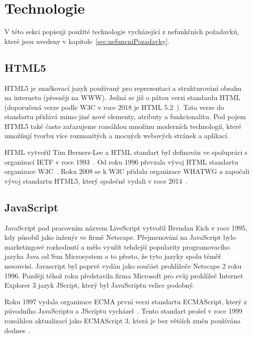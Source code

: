 
\section{Technologie}\label{sec:technologie}
V této sekci popisuji použité technologie vycházející z nefunkčních požadavků, které jsou uvedeny v kapitole~\ref{sec:nefuncniPozadavky}.

\subsection{HTML5}\label{subsec:html5}

HTML5 je značkovací jazyk používaný pro reprezentaci a strukturování  obsahu na internetu (přesněji na \gls{WWW}).
Jedná se již o pátou verzi standardu \gls{HTML} (doporučená verze podle \gls{W3C} v roce 2018 je HTML 5.2~\cite{w3c:html52}).
Tato verze do standartu přidává mimo jiné nové elementy, atributy a funkcionalitu.
Pod pojem HTML5 také často zařazujeme rozsáhlou množinu moderních technologií, které umožňují tvorbu více rozmanitých a mocných webových stránek a aplikací.~\cite{mozzila:html5}

\gls{HTML} vytvořil Tim Berners-Lee a \gls{HTML} standart byl definován ve spolupráci s organizací \gls{IETF} v roce 1993~\cite{html:autor}.
Od roku 1996 převzala vývoj \gls{HTML} standartu organizace \gls{W3C}~\cite{w3c:html32}.
Roku 2008 se k \gls{W3C} přidala organizace \gls{WHATWG} a započali vývoj standartu HTML5, který společně vydali v roce 2014~\cite{w3c:html5}.

\subsection{JavaScript}\label{subsec:javascript}

JavaScript pod pracovním názvem LiveScript vytvořil Brendan Eich v roce 1995, kdy působil jako inženýr ve firmě Netscape.
Přejmenování na JavaScript bylo marketingové rozhodnutí a mělo využít tehdejší popularity programovacího jazyka Java od Sun Microsystem a to přesto, že tyto jazyky spolu téměř nesouvisí.
Javascript byl poprvé vydán jako součást prohlížeče Netscape 2 roku 1996.
Později téhož roku představila firma Microsoft pro svůj prohlížeč Internet Explorer 3 jazyk JScript, který byl JavaScriptu velice podobný.~\cite{mozzila:javascript}

Roku 1997 vydala organizace \gls{ECMA} první verzi standartu ECMAScript, který z původního JavaScriptu a JScriptu vycházel~\cite{ecma:ecmascript1}.
Tento standart prošel v roce 1999 rozsáhlou aktualizací jako ECMAScript 3, která je bez větších změn používána dodnes~\cite{mozzila:javascript}.

